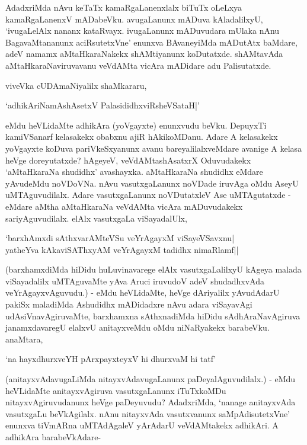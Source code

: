 AdadxriMda nAvu keTaTx kamaRgaLanenxlalx biTuTx oLeLxya kamaRgaLanenxV mADabeVku. avugaLanunx mADuva kAladalilxyU, `ivugaLelAlx nananx kataRvayx. ivugaLanunx mADuvudara mUlaka nAnu BagavaMtananunx aciRsutetxVne' enunxva BAvaneyiMda mADutAtx baMdare, adeV namamx aMtaHkaraNakekx shAMtiyanunx koDutatxde. shAMtavAda aMtaHkaraNaviruvavanu veVdAMta vicAra mADidare adu Palisutatxde.

viveVka cUDAmaNiyalilx shaMkararu,

\begin{shloka}
`adhikAriNamAshAsetxV PalasididhxviRsheVSataH|'
\end{shloka}

eMdu heVLidaMte adhikAra (yoVgayxte) enunxvudu beVku. DepuyxTi kamiVSanarf kelasakekx obabxnu ajiR hAkikoMDanu. Adare A kelasakekx yoVgayxte koDuva pariVkeSxyanunx avanu bareyalilalxveMdare avanige A kelasa heVge doreyutatxde? hAgeyeV, veVdAMtashAsatxrX Oduvudakekx `aMtaHkaraNa shudidhx' avashayxka. aMtaHkaraNa shudidhx eMdare yAvudeMdu noVDoVNa. nAvu vasutxgaLanunx noVDade iruvAga oMdu AseyU uMTAguvudilalx. Adare vasutxgaLanunx noVDutatxleV Ase uMTAgutatxde - eMdare aMtha aMtaHkaraNa veVdAMta vicAra mADuvudakekx sariyAguvudilalx. elAlx vasutxgaLa viSayadalUlx,

\begin{shloka}
`barxhAmxdi sAthxvarAMteVSu veYrAgayxM viSayeVSavxnu|\\
yatheYva kAkaviSAThxyAM veYrAgayxM tadidhx nimaRlamf||
\end{shloka}

(barxhamxdiMda hiDidu huLuvinavarege elAlx vasutxgaLalilxyU kAgeya malada viSayadalilx uMTAguvaMte yAva Aruci iruvudoV adeV shudadhxvAda veYrAgayxvAguvudu.) - eMdu heVLidaMte, heVge dAriyalilx yAvudAdarU pakiSx maladiMda Ashudidhx mADidadxre nAvu adara viSayavAgi udAsiVnavAgiruvaMte, barxhamxna sAthxnadiMda hiDidu sAdhAraNavAgiruva janamxdavaregU elalxvU anitayxveMdu oMdu niNaRyakekx barabeVku. anaMtara,

\begin{shloka}
`na hayxdhurxveYH pArxpayxteyxV hi dhurxvaM hi tatf'
\end{shloka}

(anitayxvAdavugaLiMda nitayxvAdavugaLanunx paDeyalAguvudilalx.) - eMdu heVLidaMte anitayxvAgiruva vasutxgaLanunx iTuTxkoMDu nitayxvAgiruvudanunx heVge paDeyuvudu? AdadxriMda, `nanage anitayxvAda vasutxgaLu beVkAgilalx. nAnu nitayxvAda vasutxvanunx saMpAdisutetxVne' enunxva tiVmARna uMTAdAgaleV yArAdarU veVdAMtakekx adhikAri. A adhikAra barabeVkAdare-

